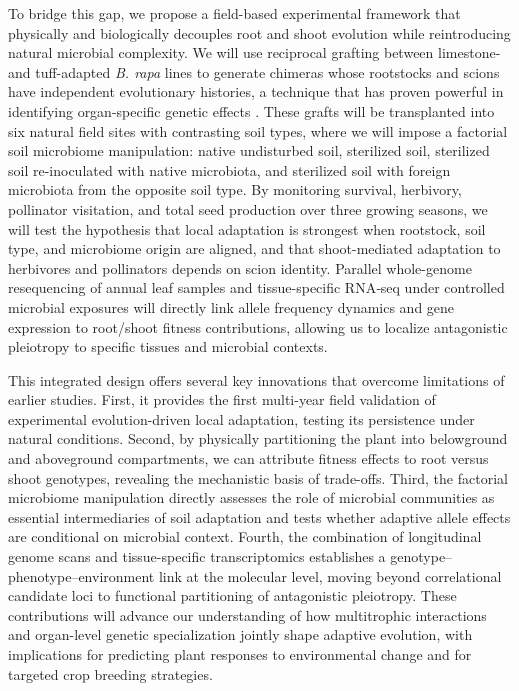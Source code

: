 \documentclass{article}
\begin{document}
To bridge this gap, we propose a field-based experimental framework that physically and biologically decouples root and shoot evolution while reintroducing natural microbial complexity. We will use reciprocal grafting between limestone- and tuff-adapted \textit{B. rapa} lines to generate chimeras whose rootstocks and scions have independent evolutionary histories, a technique that has proven powerful in identifying organ-specific genetic effects \cite{turnbull2002grafting}. These grafts will be transplanted into six natural field sites with contrasting soil types, where we will impose a factorial soil microbiome manipulation: native undisturbed soil, sterilized soil, sterilized soil re-inoculated with native microbiota, and sterilized soil with foreign microbiota from the opposite soil type. By monitoring survival, herbivory, pollinator visitation, and total seed production over three growing seasons, we will test the hypothesis that local adaptation is strongest when rootstock, soil type, and microbiome origin are aligned, and that shoot-mediated adaptation to herbivores and pollinators depends on scion identity. Parallel whole-genome resequencing of annual leaf samples and tissue-specific RNA‑seq under controlled microbial exposures will directly link allele frequency dynamics and gene expression to root/shoot fitness contributions, allowing us to localize antagonistic pleiotropy to specific tissues and microbial contexts.

This integrated design offers several key innovations that overcome limitations of earlier studies. First, it provides the first multi-year field validation of experimental evolution-driven local adaptation, testing its persistence under natural conditions. Second, by physically partitioning the plant into belowground and aboveground compartments, we can attribute fitness effects to root versus shoot genotypes, revealing the mechanistic basis of trade-offs. Third, the factorial microbiome manipulation directly assesses the role of microbial communities as essential intermediaries of soil adaptation and tests whether adaptive allele effects are conditional on microbial context. Fourth, the combination of longitudinal genome scans and tissue-specific transcriptomics establishes a genotype–phenotype–environment link at the molecular level, moving beyond correlational candidate loci to functional partitioning of antagonistic pleiotropy. These contributions will advance our understanding of how multitrophic interactions and organ-level genetic specialization jointly shape adaptive evolution, with implications for predicting plant responses to environmental change and for targeted crop breeding strategies.
\end{document}
